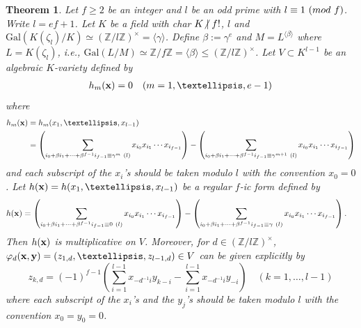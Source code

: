 \documentclass[10pt,a4paper]{amsart}
\newtheorem{thm}{Theorem}
\newcommand{\Gal}{\mathrm{Gal}}
\newcommand{\Z}{\mathbb Z}
\newcommand{\notmid}{\mathrel{\ooalign{$\mkern-5mu\not$\crcr$|$}}}
\begin{document}
\begin{thm}\label{mainth3}
Let $f\geq2$ be an integer and $l$ be an odd prime with $l \equiv 1\ ({\rm mod}\ f)$. 
Write $l=ef+1$.
Let $K$ be a field with char $K \notmid f!$, $l$ and 
$\Gal(K(\zeta_l)/K)\simeq (\Z/l\Z)^{\times}=\langle \gamma \rangle$. 
Define $\beta := \gamma^e$ and $M=L^{\langle \beta \rangle}$ where $L=K(\zeta_l)$, 
i.e., $\Gal(L/M)\simeq \Z/f\Z = \langle \beta \rangle \leq  (\Z/l\Z)^{\times}$.
Let $V \subset K^{l-1}$ be
an algebraic $K$-variety defined by
\begin{align*}
h_m({\bf x})=0\quad (m = 1,\ldots,e-1)
\end{align*}
where
\begin{align*}
h_m({\bf x})&=h_m(x_1,\ldots,x_{l-1})\\
&=\left(\sum_{i_0 + \beta i_1 + \cdots +\beta^{f-1}i_{f-1} \equiv \gamma^m \ (l)}x_{i_0}x_{i_1}\cdots x_{i_{f-1}}\right) - \left(\sum_{i_0 + \beta i_1 + \cdots +\beta^{f-1}i_{f-1} \equiv \gamma^{m+1} \ (l)}x_{i_0}x_{i_1}\cdots x_{i_{f-1}}\right)
\end{align*}
and each subscript of the $x_{i}$'s should be taken modulo $l$ with the convention $x_0=0$.
Let $h({\bf x})=h(x_1,\ldots,x_{l-1})$ be a regular $f$-ic form defined by
\begin{align*}
h({\bf x})
&=\left(\sum_{i_0 + \beta i_1 + \cdots +\beta^{f-1}i_{f-1}\equiv 0 \ (l)}x_{i_0}x_{i_1}\cdots x_{i_{f-1}}\right)
-\left(\sum_{i_0 + \beta i_1 + \cdots +\beta^{f-1}i_{f-1}\equiv \gamma \ (l)}x_{i_0}x_{i_1}\cdots x_{i_{f-1}}\right).
\end{align*}
Then $h({\bf x})$ is multiplicative on $V$.
Moreover, for $d \in (\Z/l\Z)^{\times}$, $\varphi_d ({\bf x},{\bf y})=(z_{1,d},\ldots,z_{l-1,d}) \in V$ 
can be given explicitly by
\[
z_{k,d}=(-1)^{f-1} \left(\sum_{i=1}^{l-1}x_{-d^{-1}i}y_{k-i} - \sum_{i=1}^{l-1}x_{-d^{-1}i}y_{-i}\right)\quad (k=1,\ldots,l-1)
\]
where each subscript of the $x_i$'s and the $y_j$'s should be taken modulo $l$ with the convention $x_0=y_0=0$.
\end{thm}
\end{document}
